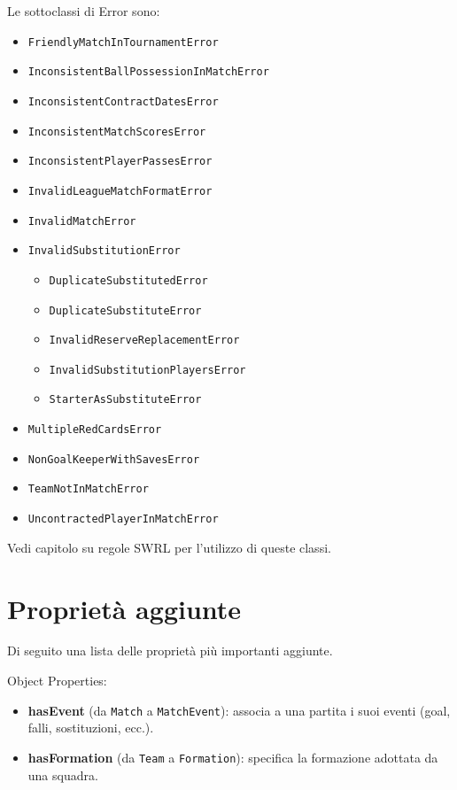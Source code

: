 \documentclass[11pt]{report} %
\begin{document}
\begin{itemize}[leftmargin=*]
Le sottoclassi di Error sono: 
\begin{itemize}
    \item \texttt{FriendlyMatchInTournamentError}
    \item \texttt{InconsistentBallPossessionInMatchError}
    \item \texttt{InconsistentContractDatesError}
    \item \texttt{InconsistentMatchScoresError}
    \item \texttt{InconsistentPlayerPassesError}
    \item \texttt{InvalidLeagueMatchFormatError}
    \item \texttt{InvalidMatchError}
    \item \texttt{InvalidSubstitutionError}
    \begin{itemize}
        \item \texttt{DuplicateSubstitutedError}
        \item \texttt{DuplicateSubstituteError}
        \item \texttt{InvalidReserveReplacementError}
        \item \texttt{InvalidSubstitutionPlayersError}
        \item \texttt{StarterAsSubstituteError}
    \end{itemize}
    \item \texttt{MultipleRedCardsError}
    \item \texttt{NonGoalKeeperWithSavesError}
    \item \texttt{TeamNotInMatchError}
    \item \texttt{UncontractedPlayerInMatchError}
\end{itemize}

Vedi capitolo su regole SWRL per l'utilizzo di queste classi.
\newpage

\section{Proprietà aggiunte}
Di seguito una lista delle proprietà più importanti aggiunte.

Object Properties:
\begin{itemize}
    \item \textbf{hasEvent} (da \texttt{Match} a \texttt{MatchEvent}): associa a una partita i suoi eventi (goal, falli, sostituzioni, ecc.).

\item \textbf{hasFormation} (da \texttt{Team} a \texttt{Formation}): specifica la formazione adottata da una squadra.


\end{itemize}
\end{itemize}
\end{document}

